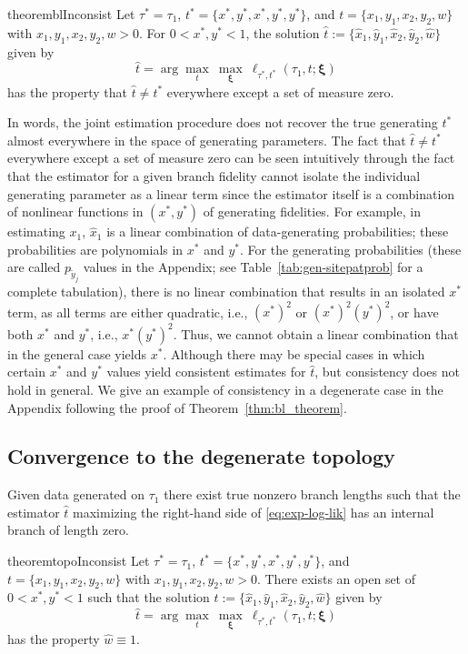 \documentclass[11pt]{article}
\newcommand{\siteSplit}{\tilde{y}}
\begin{document}
\begin{restatable}{theorem}{blInconsist}
\label{thm:bl_theorem}
Let $\tau^*=\tau_1$, $t^*=\{x^*, y^*, x^*, y^*, y^*\}$, and $t=\{x_1, y_1, x_2, y_2, w\}$ with $x_1, y_1, x_2, y_2, w > 0$.
For $0 < x^*, y^* < 1$, the solution $\hat{t} := \{\hat{x}_1,\hat{y}_1,\hat{x}_2,\hat{y}_2,\hat{w}\}$ given by
\[
\hat{t} = \arg\max_{t} \ \max_{\boldsymbol\xi} \ \ell_{\tau^*,t^*}(\tau_1, t; \boldsymbol\xi)
\]
has the property that $\hat{t} \neq t^*$ everywhere except a set of measure zero.
\end{restatable}

In words, the joint estimation procedure does not recover the true generating $t^*$ almost everywhere in the space of generating parameters.
The fact that $\hat{t} \neq t^*$ everywhere except a set of measure zero can be seen intuitively through the fact that the estimator for a given branch fidelity cannot isolate the individual generating parameter as a linear term since the estimator itself is a combination of nonlinear functions in $(x^*,y^*)$ of generating fidelities.
For example, in estimating $x_1$, $\hat{x}_1$ is a linear combination of data-generating probabilities; these probabilities are polynomials in $x^*$ and $y^*$.
For the generating probabilities (these are called $p_{\siteSplit_j}$ values in the Appendix; see Table~\ref{tab:gen-sitepatprob} for a complete tabulation), there is no linear combination that results in an isolated $x^*$ term, as all terms are either quadratic, i.e., $(x^*)^2$ or $(x^*)^2(y^*)^2$, or have both $x^*$ and $y^*$, i.e., $x^*(y^*)^2$.
Thus, we cannot obtain a linear combination that in the general case yields $x^*$.
Although there may be special cases in which certain $x^*$ and $y^*$ values yield consistent estimates for $\hat{t}$, but consistency does not hold in general.
We give an example of consistency in a degenerate case in the Appendix following the proof of Theorem~\ref{thm:bl_theorem}.

\subsection*{Convergence to the degenerate topology}
Given data generated on $\tau_1$ there exist true nonzero branch lengths such that the estimator $\hat{t}$ maximizing the right-hand side of \eqref{eq:exp-log-lik} has an internal branch of length zero.
\begin{restatable}{theorem}{topoInconsist}
\label{thm:topo_theorem}
Let $\tau^*=\tau_1$, $t^*=\{x^*, y^*, x^*, y^*, y^*\}$, and $t=\{x_1, y_1, x_2, y_2, w\}$ with $x_1, y_1, x_2, y_2, w > 0$.
There exists an open set of $0 < x^*, y^* < 1$ such that the solution $\hat{t} := \{\hat{x}_1,\hat{y}_1,\hat{x}_2,\hat{y}_2,\hat{w}\}$ given by
\[
\hat{t} = \arg\max_{t} \ \max_{\boldsymbol\xi} \ \ell_{\tau^*,t^*}(\tau_1, t; \boldsymbol\xi)
\]
has the property $\hat{w}\equiv 1$.
\end{restatable}
\end{document}
